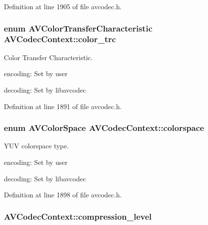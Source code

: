 Definition at line 1905 of file avcodec.\+h.

\subsubsection[{\texorpdfstring{color\+\_\+trc}{color_trc}}]{\setlength{\rightskip}{0pt plus 5cm}enum {\bf A\+V\+Color\+Transfer\+Characteristic} A\+V\+Codec\+Context\+::color\+\_\+trc}\hypertarget{struct_a_v_codec_context_ab649e8c599f5a0e2a30448e67a36deb6}{}\label{struct_a_v_codec_context_ab649e8c599f5a0e2a30448e67a36deb6}
Color Transfer Characteristic.
\begin{DoxyItemize}
\item encoding\+: Set by user
\item decoding\+: Set by libavcodec 
\end{DoxyItemize}

Definition at line 1891 of file avcodec.\+h.

\subsubsection[{\texorpdfstring{colorspace}{colorspace}}]{\setlength{\rightskip}{0pt plus 5cm}enum {\bf A\+V\+Color\+Space} A\+V\+Codec\+Context\+::colorspace}\hypertarget{struct_a_v_codec_context_a8cd8caa7d40319324ce3d879a2edbd9f}{}\label{struct_a_v_codec_context_a8cd8caa7d40319324ce3d879a2edbd9f}
Y\+UV colorspace type.
\begin{DoxyItemize}
\item encoding\+: Set by user
\item decoding\+: Set by libavcodec 
\end{DoxyItemize}

Definition at line 1898 of file avcodec.\+h.

\subsubsection[{\texorpdfstring{compression\+\_\+level}{compression_level}}]{ A\+V\+Codec\+Context\+::compression\+\_\+level}\hypertarget{struct_a_v_codec_context_aa401ca663644caa51ede1889659c23d6}{}\label{struct_a_v_codec_context_aa401ca663644caa51ede1889659c23d6}

